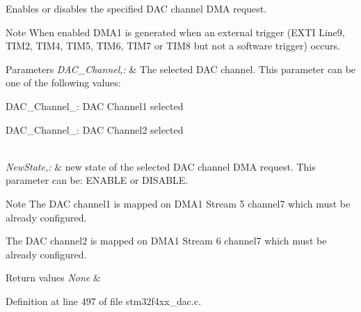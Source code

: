 Enables or disables the specified D\-A\-C channel D\-M\-A request. 

\begin{DoxyNote}{Note}
When enabled D\-M\-A1 is generated when an external trigger (E\-X\-T\-I Line9, T\-I\-M2, T\-I\-M4, T\-I\-M5, T\-I\-M6, T\-I\-M7 or T\-I\-M8 but not a software trigger) occurs. 
\end{DoxyNote}

\begin{DoxyParams}{Parameters}
{\em D\-A\-C\-\_\-\-Channel,\-:} & The selected D\-A\-C channel. This parameter can be one of the following values\-: \begin{DoxyItemize}
\item D\-A\-C\-\_\-\-Channel\-\_\-: D\-A\-C Channel1 selected \item D\-A\-C\-\_\-\-Channel\-\_\-: D\-A\-C Channel2 selected \end{DoxyItemize}
\\
\hline
{\em New\-State,\-:} & new state of the selected D\-A\-C channel D\-M\-A request. This parameter can be\-: E\-N\-A\-B\-L\-E or D\-I\-S\-A\-B\-L\-E. \\
\hline
\end{DoxyParams}
\begin{DoxyNote}{Note}
The D\-A\-C channel1 is mapped on D\-M\-A1 Stream 5 channel7 which must be already configured. 

The D\-A\-C channel2 is mapped on D\-M\-A1 Stream 6 channel7 which must be already configured. 
\end{DoxyNote}

\begin{DoxyRetVals}{Return values}
{\em None} & \\
\hline
\end{DoxyRetVals}


Definition at line 497 of file stm32f4xx\-\_\-dac.\-c.

